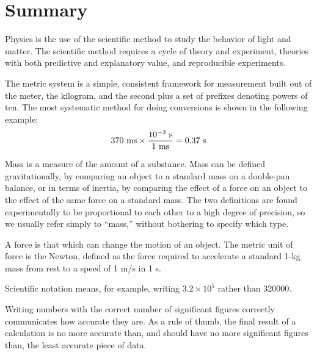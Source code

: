 


\section{Summary}

 Physics is the use of the scientific method to study the
 behavior of light and matter. The scientific method requires
 a cycle of theory and experiment, theories with both
 predictive and explanatory value, and reproducible experiments.

 The metric system is a simple, consistent framework for
 measurement built out of the meter, the kilogram, and the
 second plus a set of prefixes denoting powers of ten. The
 most systematic method for doing conversions is shown in
 the following example:
 \begin{equation*}
   370\ \zu{ms} \times \frac{10^{-3}\ \sunit}{1\ \zu{ms}} = 0.37\ \sunit
 \end{equation*}

 Mass is a measure of the amount of a substance. Mass can be 
 defined gravitationally, by comparing an object to a
 standard mass on a double-pan balance, or in terms of
 inertia, by comparing the effect of a force on an object to
 the effect of the same force on a standard mass. The two
 definitions are found experimentally to be proportional to
 each other to a high degree of precision, so we usually
 refer simply to ``mass,'' without bothering to specify which type.

 A force is that which can change the motion of an object.
The metric unit of force is the Newton, defined as the force
 required to accelerate a standard 1-kg mass from rest to a
 speed of 1 m/s in 1 s.

 Scientific notation means, for example, writing $3.2\times10^5$ rather than 320000.

 Writing numbers with the correct number of significant
 figures correctly communicates how accurate they are. As a
 rule of thumb, the final result of a calculation is no more
 accurate than, and should have no more significant figures
 than, the least accurate piece of data.





